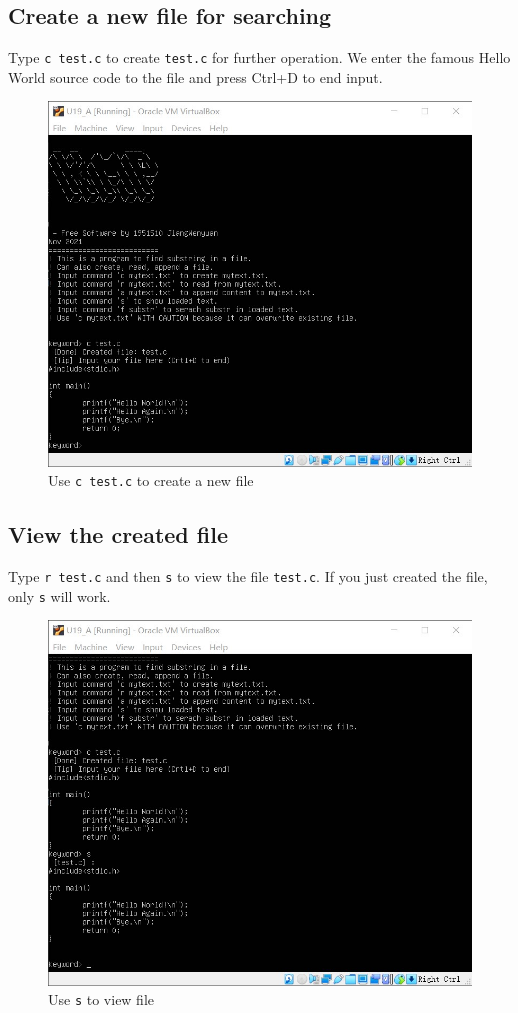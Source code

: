 \documentclass[cn,black,12pt,normal]{elegantnote}
\begin{document}
\subsection{Create a new file for searching}

Type \lstinline{c test.c} to create \lstinline{test.c} for further operation. We enter the famous Hello World source code to the file and press Ctrl+D to end input.

\begin{figure}[H]
    \centering
    \includegraphics[width=0.6\linewidth]{image/kmp_02.jpg}
    \caption{Use \lstinline{c test.c} to create a new file}
\end{figure}

\subsection{View the created file}
Type \lstinline{r test.c} and then \lstinline{s} to view the file \lstinline{test.c}. If you just created the file, only \lstinline{s} will work.

\begin{figure}[H]
    \centering
    \includegraphics[width=0.6\linewidth]{image/kmp_03.jpg}
    \caption{Use \lstinline{s} to view file}
\end{figure}
\end{document}
